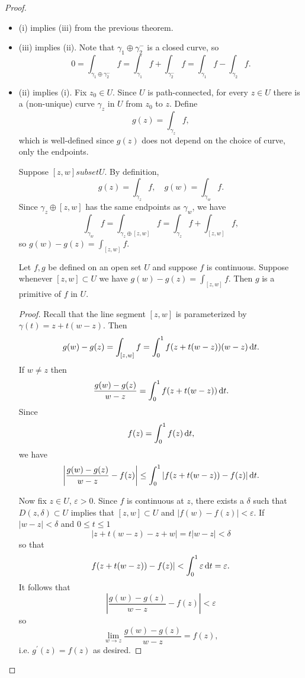 \begin{proof}
  \begin{itemize}
    \item{
      (i) implies (iii) from the previous theorem.
    }
    \item{
      (iii) implies (ii). Note that
      $\gamma_1 \oplus \gamma_2^{-}$ is a closed curve, so
      $$
      0
      =
      \int_{\gamma_1 \oplus \gamma_2^{-}} f
      =
      \int_{\gamma_1} f + \int_{\gamma_2^{-}} f
      =
      \int_{\gamma_1} f - \int_{\gamma_2} f.
      $$
    }
    \item{
      (ii) implies (i). Fix $z_0 \in U$. Since $U$ is path-connected,
      for every $z \in U$ there is a (non-unique) curve $\gamma_z$ in $U$ from
      $z_0$ to $z$. Define
      $$
      g(z) = \int_{\gamma_z} f,
      $$
      which is well-defined since $g(z)$ does not depend on the choice of curve,
      only the endpoints.

      Suppose $[z, w] subset U$. By definition,
      $$
      g(z) = \int_{\gamma_z} f, \quad
      g(w) = \int_{\gamma_w} f.
      $$
      Since $\gamma_z \oplus [z, w]$ has the same endpoints as $\gamma_w$,
      we have
      $$
      \int_{\gamma_w} f
      =
      \int_{\gamma_z \oplus [z, w]} f
      =
      \int_{\gamma_z} f + \int_{[z,w]} f,
      $$
      so $g(w) - g(z) = \int_{[z,w]} f$.

      \begin{lemma}
        Let $f, g$ be defined on an open set $U$ and suppose $f$ is continuous.
        Suppose whenever $[z, w] \subset U$ we have
        $g(w) - g(z) = \int_{[z, w]} f$. Then $g$ is a primitive of $f$ in $U$.
      \end{lemma}
      \begin{proof}
        Recall that the line segment $[z, w]$ is parameterized by
        $\gamma(t) = z + t(w-z)$. Then
        $$
        g(w) - g(z)
        =
        \int_{[z, w]} f
        =
        \int_0^1 f(z + t(w-z))(w-z) \mathop{}\!\mathrm{d} t.
        $$
        If $w \neq z$ then
        $$
        \frac{g(w) - g(z)}{w - z}
        =
        \int_0^1 f(z + t(w - z)) \mathop{}\!\mathrm{d} t.
        $$
        Since
        $$
        f(z) = \int_0^1 f(z) \mathop{}\!\mathrm{d} t,
        $$
        we have
        $$
        \left|\frac{g(w) - g(z)}{w - z} - f(z)\right|
        \leq
        \int_0^1 |f(z + t(w-z)) - f(z)| \mathop{}\!\mathrm{d} t.
        $$

        Now fix $z \in U$, $\varepsilon > 0$. Since $f$
        is continuous at $z$, there exists a $\delta$ such that
        $D(z, \delta) \subset U$ implies that $[z, w] \subset U$ and
        $|f(w) - f(z)| < \varepsilon$.
        If $|w - z| < \delta$ and $0 \leq t \leq 1$
        $$
        |z + t(w-z) - z + w| = t |w-z| < \delta
        $$
        so that
        $$
        f(z + t(w-z)) - f(z)| < \int_0^1 \varepsilon \mathop{}\!\mathrm{d} t = \varepsilon.
        $$
        It follows that
        $$
        \left|\frac{g(w) - g(z)}{w - z} - f(z)\right| < \varepsilon
        $$
        so
        $$
        \lim_{w \to z} \frac{g(w) - g(z)}{w - z} = f(z),
        $$
        i.e. $g^\prime(z) = f(z)$ as desired.
      \end{proof}
    }
  \end{itemize}
\end{proof}

